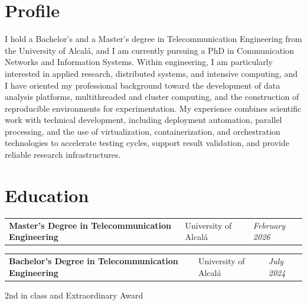 \section{Profile}
\begin{onecolentry}
	I hold a Bachelor's and a Master's degree in Telecommunication Engineering from the University of Alcalá, and I am currently pursuing a PhD in Communication Networks and Information Systems. Within engineering, I am particularly interested in applied research, distributed systems, and intensive computing, and I have oriented my professional background toward the development of data analysis platforms, multithreaded and cluster computing, and the construction of reproducible environments for experimentation. My experience combines scientific work with technical development, including deployment automation, parallel processing, and the use of virtualization, containerization, and orchestration technologies to accelerate testing cycles, support result validation, and provide reliable research infrastructures.
\end{onecolentry}

\vspace{-5pt}

\section{Education}

\begin{onecolentry}
	\begin{tabularx}{\textwidth}{@{}>{\raggedright\arraybackslash}X>{\raggedright\arraybackslash}p{3.6cm}>{\raggedleft\arraybackslash}p{2.4cm}@{}}
		\textbf{Master's Degree in Telecommunication Engineering} & University of Alcalá & \textit{February 2026}
	\end{tabularx}

\end{onecolentry}

\vspace{0.2 cm}

\begin{onecolentry}
	\begin{tabularx}{\textwidth}{@{}>{\raggedright\arraybackslash}X>{\raggedright\arraybackslash}p{3.6cm}>{\raggedleft\arraybackslash}p{2.4cm}@{}}
		\textbf{Bachelor's Degree in Telecommunication Engineering} & University of Alcalá & \textit{July 2024}
	\end{tabularx}
	
	\vspace{0.05 cm}
	\hspace{0.2cm}2nd in class and Extraordinary Award
\end{onecolentry}

